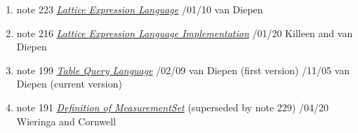 \begin{enumerate}
\item
note 223
\href{223.html}{\textit{Lattice Expression Language}}
/01/10 van Diepen

\item
note 216
\href{216.html}{\textit{Lattice Expression Language Implementation}}
/01/20 Killeen and van Diepen

\item
note 199
\href{199.html}{\textit{Table Query Language}}
/02/09 van Diepen (first version)
/11/05 van Diepen (current version)

\item
note 191
\href{191.html}{\textit{Definition of MeasurementSet}} (superseded by
  note 229)
/04/20 Wieringa and Cornwell

\end{enumerate}
